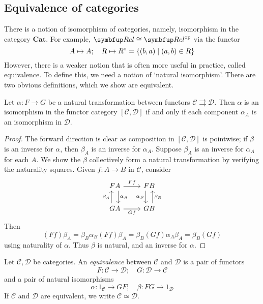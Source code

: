 \subsection{Equivalence of categories}
There is a notion of isomorphism of categories, namely, isomorphism in the category \( \mathbf{Cat} \).
For example, \( \mathbf{Rel} \cong \mathbf{Rel}^\cop \) via the functor
\[ A \mapsto A;\quad R \mapsto R^\circ = \qty{(b, a) \mid (a, b) \in R} \]
However, there is a weaker notion that is often more useful in practice, called equivalence.
To define this, we need a notion of `natural isomorphism'.
There are two obvious definitions, which we show are equivalent.
\begin{lemma}
    Let \( \alpha : F \to G \) be a natural transformation between functors \( \mathcal C \rightrightarrows \mathcal D \).
    Then \( \alpha \) is an isomorphism in the functor category \( [\mathcal C, \mathcal D] \) if and only if each component \( \alpha_A \) is an isomorphism in \( \mathcal D \).
\end{lemma}
\begin{proof}
    The forward direction is clear as composition in \( [\mathcal C, \mathcal D] \) is pointwise; if \( \beta \) is an inverse for \( \alpha \), then \( \beta_A \) is an inverse for \( \alpha_A \).
    Suppose \( \beta_A \) is an inverse for \( \alpha_A \) for each \( A \).
    We show the \( \beta \) collectively form a natural transformation by verifying the naturality squares.
    Given \( f : A \to B \) in \( \mathcal C \), consider
    \[\begin{tikzcd}
        FA & FB \\
        GA & GB
        \arrow["Ff", from=1-1, to=1-2]
        \arrow["{\alpha_A}", shift left=2, from=1-1, to=2-1]
        \arrow["Gf"', from=2-1, to=2-2]
        \arrow["{\alpha_B}"', shift right=2, from=1-2, to=2-2]
        \arrow["{\beta_B}"', shift right=2, from=2-2, to=1-2]
        \arrow["{\beta_A}", shift left=2, from=2-1, to=1-1]
    \end{tikzcd}\]
    Then
    \[ (Ff)\beta_A = \beta_B \alpha_B (Ff) \beta_A = \beta_B(Gf) \alpha_A \beta_A = \beta_B (Gf) \]
    using naturality of \( \alpha \).
    Thus \( \beta \) is natural, and an inverse for \( \alpha \).
\end{proof}
\begin{definition}
    Let \( \mathcal C, \mathcal D \) be categories.
    An \emph{equivalence} between \( \mathcal C \) and \( \mathcal D \) is a pair of functors
    \[ F : \mathcal C \to \mathcal D;\quad G : \mathcal D \to \mathcal C \]
    and a pair of natural isomorphisms
    \[ \alpha : 1_{\mathcal C} \to GF;\quad \beta : FG \to 1_{\mathcal D} \]
    If \( \mathcal C \) and \( \mathcal D \) are equivalent, we write \( \mathcal C \simeq \mathcal D \).
\end{definition}
